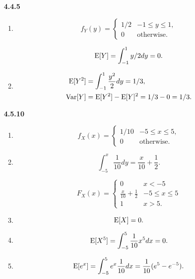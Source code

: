 \documentclass{article}
\begin{document}
\begin{enumerate}
    \item [\textbf{4.4.5}]

    \begin{enumerate}[label=(\alph*)]
    \item
        $$
        f_Y(y) =
        \begin{cases}
            1 / 2 & -1 \le y \le 1, \\
            0     & \text{otherwise}.
        \end{cases}
        $$

        $$\text E[Y] = \int_{-1}^1 y / 2 dy = 0.$$

    \item
        \begin{align*}
            \text E[Y^2] & = \int_{-1}^1 \frac{y^2}{2} dy = 1 / 3, \\
            \text{Var}[Y] & = \text E[Y^2] - \text E[Y]^2 = 1 / 3 - 0 = 1 / 3.
        \end{align*}
    \end{enumerate}

    \item [\textbf{4.5.10}]

    \begin{enumerate}[label=(\alph*)]
        \item 
        $$
        f_X(x) =
        \begin{cases}
            1 / 10 & -5 \le x \le 5, \\
            0 & \text{otherwise}.
        \end{cases}
        $$

        \item

        $$
        \int_{-5}^x \frac{1}{10} dy = \frac{x}{10} + \frac{1}{2}.
        $$

        $$
        F_X(x) =
        \begin{cases}
            0 & x < -5 \\
            \frac{x}{10} + \frac{1}{2} & -5 \le x \le 5 \\
            1 & x > 5.
        \end{cases}
        $$

        \item $$\text E[X] = 0.$$
        \item $$\text E[X^5] = \int_{-5}^5 \frac{1}{10} x^5 dx = 0.$$
        \item $$\text E[e^x] = \int_{-5}^5 e^x \frac{1}{10} dx = \frac{1}{10} (e^5 - e^{-5}).$$


\end{enumerate}
\end{enumerate}
\end{document}
